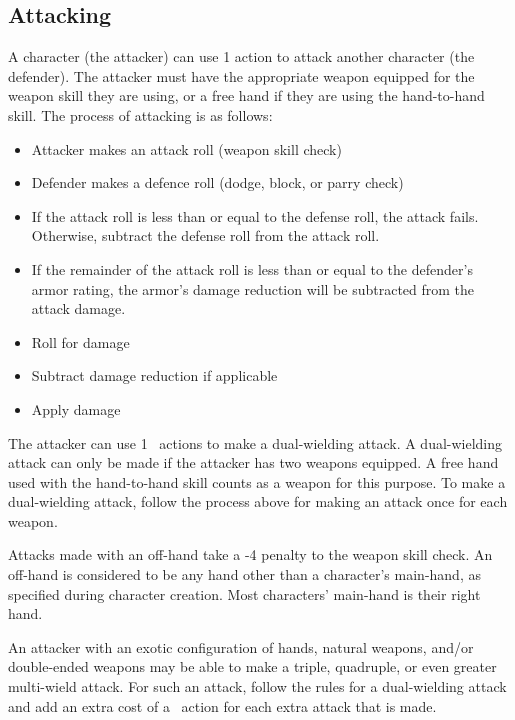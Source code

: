 \begin{multicols*}{2}
    \section{Attacking}
    A character (the attacker) can use 1 action to attack another character
    (the defender). The attacker must have the appropriate weapon equipped
    for the weapon skill they are using, or a free hand if they are using
    the hand-to-hand skill. The process of attacking is as follows:
    \begin{itemize}
        \item Attacker makes an attack roll (weapon skill check)
        \item Defender makes a defence roll (dodge, block, or parry check)
        \item If the attack roll is less than or equal to the defense roll, the
                attack fails. Otherwise, subtract the defense roll from the
                attack roll.
        \item If the remainder of the attack roll is less than or equal to the
                defender's armor rating, the armor's damage reduction will be
                subtracted from the attack damage.
        \item Roll for damage
        \item Subtract damage reduction if applicable
        \item Apply damage
    \end{itemize}

    The attacker can use 1 \textonehalf\ actions to make a dual-wielding
    attack. A dual-wielding attack can only be made if the attacker has
    two weapons equipped. A free hand used with the hand-to-hand skill counts
    as a weapon for this purpose. To make a dual-wielding attack, follow the
    process above for making an attack once for each weapon.

    Attacks made with an off-hand take a -4 penalty to the weapon skill check.
    An off-hand is considered to be any hand other than a character's
    main-hand, as specified during character creation. Most characters'
    main-hand is their right hand.

    An attacker with an exotic configuration of hands, natural weapons,
    and/or double-ended weapons may be able to make a triple, quadruple,
    or even greater multi-wield attack. For such an attack, follow the rules
    for a dual-wielding attack and add an extra cost of a \textonehalf\ action
    for each extra attack that is made.


\end{multicols*}
